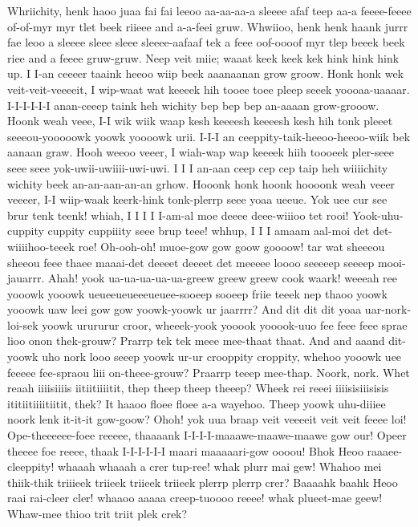 \documentclass[12pt,a4paper]{article}
\begin{document}
\begin{drama}
\trocspeaks
Whriichity, henk haoo juaa fai fai leeoo aa-aa-aa-a sleeee afaf teep aa-a feeee-feeee of-of-myr myr tlet beek riieee and a-a-feei gruw. Whwiioo, henk henk haank jurrr fae leoo a sleeee sleee sleee sleeee-aafaaf tek a feee oof-oooof myr tlep beeek beek riee and a feeee gruw-gruw.
\euelspeaks
Neep veit miie; waaat keek keek kek hink hink hink up.
\trocspeaks
I I-an ceeeer taaink heeoo wiip beek aaanaanan grow groow. Honk honk wek veit-veit-veeeeit, I wip-waat wat keeeek hih tooee toee pleep seeek yoooaa-uaaaar. I-I-I-I-I-I anan-ceeep taink heh wichity bep bep bep an-aaaan grow-grooow. Hoonk weah veee, I-I wik wiik waap kesh keeeesh keeeesh kesh hih tonk pleeet seeeou-yooooowk yoowk yoooowk urii. I-I-I an ceeppity-taik-heeoo-heeoo-wiik bek aanaan graw. Hooh weeoo veeer, I wiah-wap wap keeeek hiih toooeek pler-seee seee seee yok-uwii-uwiiii-uwi-uwi. I I I an-aan ceep cep cep taip heh wiiiichity wichity beek an-an-aan-an-an grhow. Hooonk honk hoonk hoooonk weah veeer veeeer, I-I wiip-waak keerk-hink tonk-plerrp seee yoaa ueeue.
\pistspeaks
Yok uee cur see brur tenk teenk! whiah, I I I I I-am-al moe deeee deee-wiiioo tet rooi! Yook-uhu-cuppity cuppity cuppiiity seee brup teee! whhup, I I I amaam aal-moi det det-wiiiihoo-teeek roe!
\euelspeaks
Oh-ooh-oh! muoe-gow gow goow goooow! tar wat sheeeou sheeou feee thaee maaai-det deeeet deeeet det meeeee loooo seeeeep seeeep mooi-jauarrr.
\pistspeaks
Ahah! yook ua-ua-ua-ua-ua-greew greew greew cook waark! weeeah ree yooowk yooowk ueueeueueeeueuee-sooeep sooeep friie teeek nep thaoo yoowk yooowk uaw leei gow gow yoowk-yoowk ur jaarrrr?
\euelspeaks
And dit dit dit yoaa uar-nork-loi-sek yoowk urururur croor, wheeek-yook yooook yooook-uuo fee feee feee sprae lioo onon thek-grouw? Prarrp tek tek meee mee-thaat thaat. And and aaand dit-yoowk uho nork looo seeep yoowk ur-ur crooppity croppity, whehoo yooowk uee feeeee fee-spraou liii on-theee-grouw? Praarrp teeep mee-thap.
\pistspeaks
Noork, nork.
\euelspeaks
Whet reaah iiiisiiiis iitiitiiiitit, thep theep theep theeep? Wheek rei reeei iiiisisiiisisis ititiitiiiitiitit, thek?
\pistspeaks
It haaoo floee floee a-a wayehoo.
\euelspeaks
Theep yoowk uhu-diiiee noork lenk it-it-it gow-goow? Ohoh! yok uua braap veit veeeeit veit veit feeee loi!
\epopspeaks
Ope-theeeeee-foee reeeee, thaaaank I-I-I-I-maaawe-maawe-maawe gow our! Opeer theeee foe reeee, thaak I-I-I-I-I-I maari maaaaari-gow oooou!
\euelspeaks
Bhok Heoo raaaee-cleeppity! whaaah whaaah a crer tup-ree! whak plurr mai gew! Whahoo mei thiik-thik triiieek triieek triieek triieek plerrp plerrp crer? Baaaahk baahk Heoo raai rai-cleer cler! whaaoo aaaaa creep-tuoooo reeee! whak plueet-mae geew! Whaw-mee thioo trit triit plek crek?

\end{drama}
\end{document}
